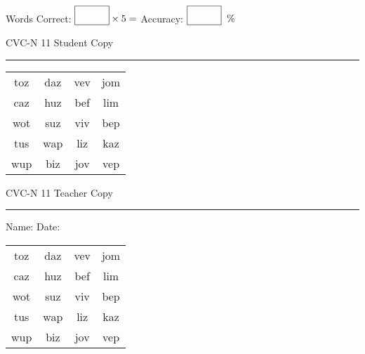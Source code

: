 \documentclass{memoir}
\begin{document}
\small

Words Correct: $\fbox{\phantom{\huge 100}} \times 5 = $ Accuracy: $\fbox{\phantom{\huge 100}}\;\; \%$ 

\vfill

\newpage


\footnotesize \noindent
CVC-N 11 \hfill Student Copy
\smallskip
\hrule

\Large

\setlength{\tabcolsep}{14pt}
\def\arraystretch{2}

{\selectfont


\begin{vplace}[0.5]
\begin{center}
\begin{tabular}{cccc}
toz & daz & vev & jom \\
caz & huz & bef & lim \\
wot & suz & viv & bep \\
tus & wap & liz & kaz \\
wup & biz & jov & vep \\
\end{tabular}
\end{center}
\end{vplace}

}

\newpage

\footnotesize \noindent
CVC-N 11 \hfill Teacher Copy
\smallskip
\hrule

\small

\vfill

\noindent
Name: \underline{\hspace{1.75in}} \hfill Date: \underline{\hspace{1in}}

\Large

{\selectfont


\begin{vplace}[0.5]
\begin{center}
\begin{tabular}{cccc}
toz & daz & vev & jom \\
caz & huz & bef & lim \\
wot & suz & viv & bep \\
tus & wap & liz & kaz \\
wup & biz & jov & vep \\
\end{tabular}
\end{center}
\end{vplace}



}
\end{document}
